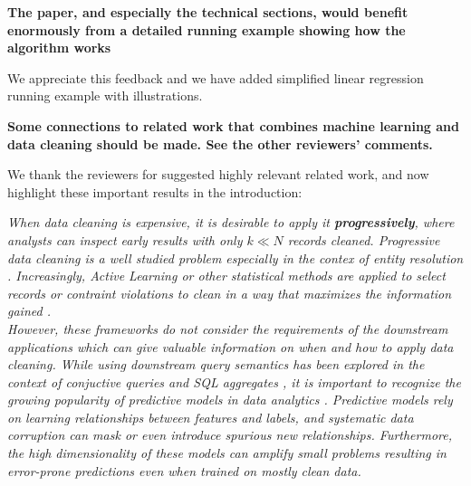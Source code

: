 
\vspace{0.25em}

\textbf{The paper, and especially the technical sections, would benefit enormously from a detailed running example showing how the algorithm works}

We appreciate this feedback and we have added simplified linear regression running example with illustrations. 


\vspace{0.25em}

\textbf{Some connections to related work that combines machine learning and data cleaning should be made. See the other reviewers' comments.}

We thank the reviewers for suggested highly relevant related work, and now highlight these important results in the introduction:

\emph{When data cleaning is expensive, it is desirable to apply it \textbf{progressively}, where analysts can inspect early results with only $k \ll N$ records cleaned.
Progressive data cleaning is a well studied problem especially in the contex of entity resolution \cite{whang2014incremental, papenbrock2015progressive, gruenheid2014incremental}.
Increasingly, Active Learning \cite{settles2010active} or other statistical methods are applied to select records or contraint violations to clean in a way that maximizes the information gained \cite{DBLP:journals/pvldb/YakoutENOI11, gokhale2014corleone, yakout2013don}.\\
However, these frameworks do not consider the requirements of the downstream applications which can give valuable information on when and how to apply data cleaning.
While using downstream query semantics has been explored in the context of conjuctive queries \cite{DBLP:conf/sigmod/BergmanMNT15} and SQL aggregates \cite{wang1999sample}, it is important to recognize the growing popularity of predictive models in data analytics \cite{bdas, alexandrov2014stratosphere, crotty2014tupleware, hellerstein2012madlib}.
Predictive models rely on learning relationships between features and labels, and systematic data corruption \cite{taylor1982introduction} can mask or even introduce spurious new relationships.
Furthermore, the high dimensionality of these models can amplify small problems \cite{xiaofeature} resulting in error-prone predictions even when trained on mostly clean data.}

